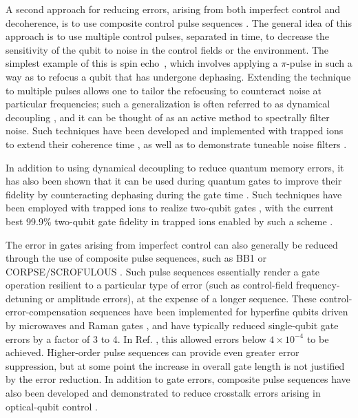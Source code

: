 \documentclass[%
12pt,
 amsmath,amssymb,
]{revtex4-2}
\begin{document}
A second approach for reducing errors, arising from both imperfect control and decoherence, is to use composite control pulse sequences \cite{MerrillCompPulseReview2014, KabytayevCompPulses2014}.  The general idea of this approach is to use multiple control pulses, separated in time, to decrease the sensitivity of the qubit to noise in the control fields or the environment.   The simplest example of this is spin echo~\cite{PhysRev.80.580}, which involves applying a $\pi$-pulse in such a way as to refocus a qubit that has undergone dephasing. Extending the technique to multiple pulses allows one to tailor the refocusing to counteract noise at particular frequencies; such a generalization is often referred to as  dynamical decoupling \cite{ViolaDynamicDecoup1998}, and it can be thought of as an active method to spectrally filter noise.  Such techniques have been developed and implemented with trapped ions to extend their coherence time \cite{BiercukDynamDecoup2009, SzwerDynamDecoup2011,Wang10MinuteCoherence2017}, as well as to demonstrate tuneable noise filters \cite{BiercukDynamDecoup2009}.

In addition to using dynamical decoupling to reduce quantum memory errors, it has also been shown that it can be used during quantum gates to improve their fidelity by counteracting dephasing during the gate time \cite{WestDynamDecoupGates2010, BermudezGate2012}. Such techniques have been employed with trapped ions to realize two-qubit gates \cite{TanDressedState2013,BallanceHybridLogic2015,manovitz2017fast}, with the current best 99.9\% two-qubit gate fidelity in trapped ions enabled by such a scheme \cite{Ballance2QubitHyperfineGate2016}.

The error in gates arising from imperfect control can also generally be reduced through the use of composite pulse sequences, such as BB1 or CORPSE/SCROFULOUS \cite{WimperisBB11994,CumminsPulseSequence2003}. Such pulse sequences essentially render a gate operation resilient to a particular type of error (such as control-field frequency-detuning or amplitude errors), at the expense of a longer sequence. These control-error-compensation sequences have been implemented for hyperfine qubits driven by microwaves \cite{TimoneyErrorResistant2008} and Raman gates \cite{MountErrorCompensation2015}, and have typically reduced single-qubit gate errors by a factor of 3 to 4. In Ref. \cite{MountErrorCompensation2015}, this allowed errors below $4 \times 10^{-4}$ to be achieved. Higher-order pulse sequences can provide even greater error suppression, but at some point the increase in overall gate length is not justified by the error reduction.  In addition to gate errors, composite pulse sequences have also been developed and demonstrated to reduce crosstalk errors arising in optical-qubit control \cite{MerrillCompCrossTalk2014, LowMethodology2016, McConnellHeisenberg2017}.
\end{document}
